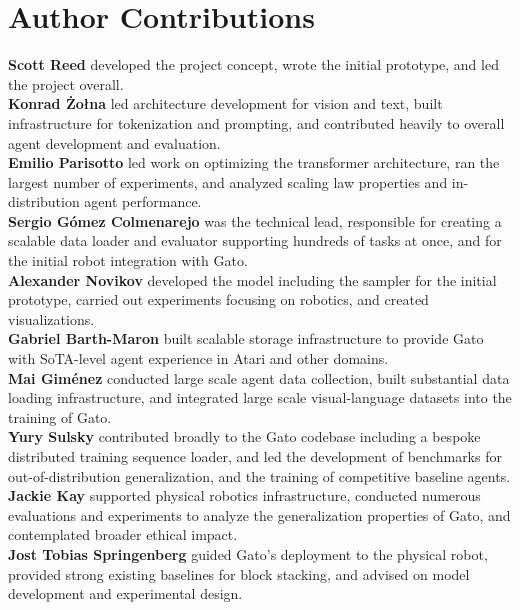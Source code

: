 \documentclass[10pt]{article} \usepackage[accepted]{tmlr}
\newcommand{\model}{{Gato}}
\begin{document}
\section*{Author Contributions}
\noindent \textbf{Scott Reed} developed the project concept, wrote the initial prototype, and led the project overall. \\
\noindent \textbf{Konrad \.Zo\l{}na} led architecture development for vision and text, built infrastructure for tokenization and prompting, and contributed heavily to overall agent development and evaluation. \\
\noindent \textbf{Emilio Parisotto} led work on optimizing the transformer architecture, ran the largest number of experiments, and analyzed scaling law properties and in-distribution agent performance. \\
\noindent \textbf{Sergio Gómez Colmenarejo} was the technical lead, responsible for creating a scalable data loader and evaluator supporting hundreds of tasks at once, and for the initial robot integration with \model{}. \\
\noindent \textbf{Alexander Novikov} developed the model including the sampler for the initial prototype, carried out experiments focusing on robotics, and created visualizations. \\
\noindent \textbf{Gabriel Barth-Maron} built scalable storage infrastructure to provide \model{} with SoTA-level agent experience in Atari and other domains. \\
\noindent \textbf{Mai Giménez} conducted large scale agent data collection, built substantial data loading infrastructure, and integrated large scale visual-language datasets into the training of \model{}. \\
\noindent \textbf{Yury Sulsky} contributed broadly to the \model{} codebase including a bespoke distributed training sequence loader, and led the development of benchmarks for out-of-distribution generalization, and the training of competitive baseline agents. \\
\noindent \textbf{Jackie Kay} supported physical robotics infrastructure, conducted numerous evaluations and experiments to analyze the generalization properties of \model{}, and contemplated broader ethical impact. \\
\noindent \textbf{Jost Tobias Springenberg} guided \model{}'s deployment to the physical robot, provided strong existing baselines for block stacking, and advised on model development and experimental design. \\
\end{document}
